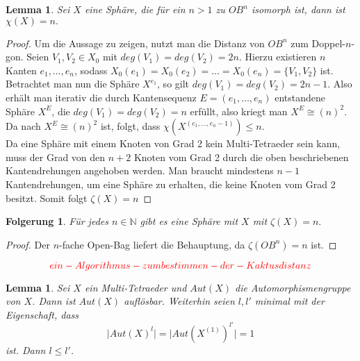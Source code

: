 \documentclass[12pt,titlepage,twoside,cleardoublepage]{article}
\theoremstyle{nummermitklammern}
\newtheorem{lemma}[temp]{Lemma}
\newtheorem{folgerung}[temp]{Folgerung}
\newtheorem{lemma}[zahl]{Lemma}
\newtheorem{folgerung}[zahl]{Folgerung}
\numberwithin{equation}{section}
\begin{document}
\begin{lemma}
Sei $X$ eine Sphäre, die für ein $n>1$ zu $OB^n$ isomorph ist, dann ist $\chi(X)=n.$
\end{lemma}
\begin{proof}
Um die Aussage zu zeigen, nutzt man die Distanz von $OB^n$ zum Doppel-$n$-gon. Seien $V_1,V_2\in X_0$ mit $deg(V_1)=deg(V_2)=2n$. Hierzu existieren $n$ Kanten $e_1,\ldots,e_n$, sodass $X_0(e_1)=X_0(e_2)=\ldots=X_0(e_n)=\{V_1,V_2\}$ ist.
Betrachtet man nun die Sphäre $X^{e_1}$, so gilt $deg(V_1)=deg(V_2)=2n-1$. Also erhält man iterativ die durch Kantensequenz $E=(e_1,\ldots,e_n)$ entstandene Sphäre $X^E$, die $deg(V_1)=deg(V_2)=n$ erfüllt, also kriegt man $X^E \cong (n)^2$. Da nach  $X^E\cong (n)^2$ ist, folgt, dass $\chi(X^{(e_1,\ldots,e_n-1)})\leq n$. \\
Da eine Sphäre mit einem Knoten von Grad 2 kein Multi-Tetraeder sein kann, muss der Grad von den $n+2$ Knoten vom Grad 2 durch die oben beschriebenen Kantendrehungen angehoben werden. Man braucht mindestens $n-1$ Kantendrehungen, um eine Sphäre zu erhalten, die keine Knoten vom Grad 2 besitzt. Somit folgt $\zeta(X)=n$
\end{proof}
\begin{folgerung}
Für jedes $n \in \mathbb{N}$ gibt es eine Sphäre mit $X$ mit $\zeta(X)=n.$
\end{folgerung}
\begin{proof}
Der $n$-fache Open-Bag liefert die Behauptung, da $\zeta(OB^{n})=n$ ist.
\end{proof}
\[
\textcolor{red}{ein-Algorithmus-zum bestimmen-der-Kaktusdistanz}
\]
\begin{lemma}
Sei $X$ ein Multi-Tetraeder und $Aut(X)$ die Automorphismengruppe von $X$. Dann ist $Aut(X)$ auflösbar.
Weiterhin seien $l,l'$ minimal mit der Eigenschaft, dass
\[
\vert Aut(X)^l\vert=\vert Aut(X^{(1)})^{l'}\vert =1
\] ist. Dann $l\leq l'$.
\end{lemma}
\end{document}
